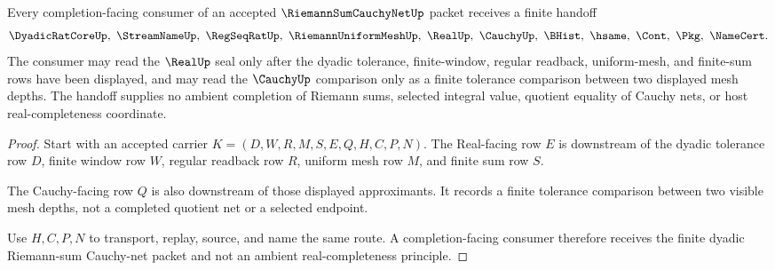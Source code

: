 \begin{theorem}
\label{thm:riemann-sum-cauchy-net-real-completion-handoff}
Every completion-facing consumer of an accepted $\RiemannSumCauchyNetUp$ packet receives a finite handoff
$$
\DyadicRatCoreUp,\ \StreamNameUp,\ \RegSeqRatUp,\ \RiemannUniformMeshUp,\ \RealUp,\ \CauchyUp,\ \BHist,\ \hsame,\ \Cont,\ \Pkg,\ \NameCert .
$$
The consumer may read the $\RealUp$ seal only after the dyadic tolerance, finite-window, regular readback, uniform-mesh, and finite-sum rows have been displayed, and may read the $\CauchyUp$ comparison only as a finite tolerance comparison between two displayed mesh depths. The handoff supplies no ambient completion of Riemann sums, selected integral value, quotient equality of Cauchy nets, or host real-completeness coordinate.
\end{theorem}
\begin{proof}
Start with an accepted carrier $K=(D,W,R,M,S,E,Q,H,C,P,N)$. The Real-facing row $E$ is downstream of the dyadic tolerance row $D$, finite window row $W$, regular readback row $R$, uniform mesh row $M$, and finite sum row $S$.

The Cauchy-facing row $Q$ is also downstream of those displayed approximants. It records a finite tolerance comparison between two visible mesh depths, not a completed quotient net or a selected endpoint.

Use $H,C,P,N$ to transport, replay, source, and name the same route. A completion-facing consumer therefore receives the finite dyadic Riemann-sum Cauchy-net packet and not an ambient real-completeness principle.
\end{proof}




